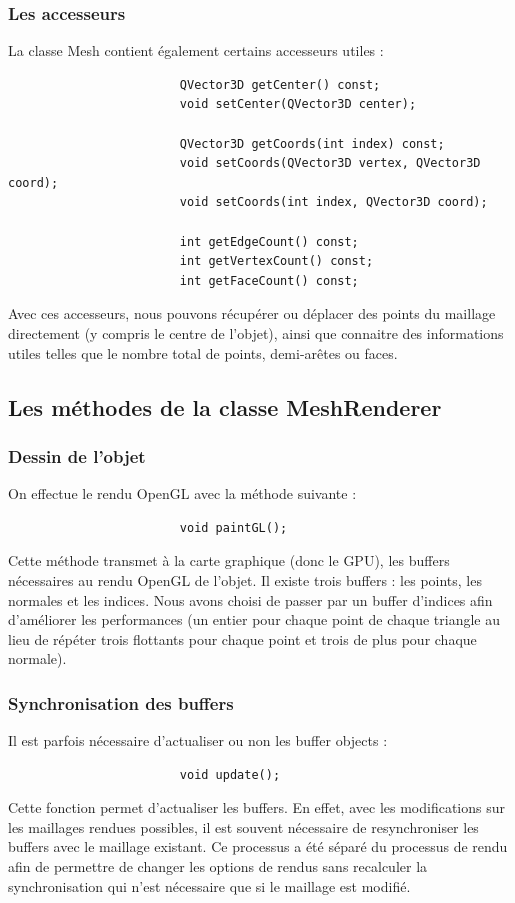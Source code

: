 \documentclass[a4paper]{memoir}
\begin{document}
				\subsubsection{Les accesseurs}
					La classe Mesh contient également certains accesseurs utiles :
					\begin{verbatim}
						QVector3D getCenter() const;
						void setCenter(QVector3D center);

						QVector3D getCoords(int index) const;
						void setCoords(QVector3D vertex, QVector3D coord);
						void setCoords(int index, QVector3D coord);

						int getEdgeCount() const;
						int getVertexCount() const;
						int getFaceCount() const;
					\end{verbatim}
					Avec ces accesseurs, nous pouvons récupérer ou déplacer des points du maillage directement (y compris le centre de l'objet), ainsi que 
					connaitre des informations utiles telles que le nombre total de points, demi-arêtes ou faces.
				
			\subsection{Les méthodes de la classe MeshRenderer}
				\label{renderer-dev}
				\subsubsection{Dessin de l'objet}
					On effectue le rendu OpenGL avec la méthode suivante :
					\begin{verbatim}
						void paintGL();
					\end{verbatim}
					Cette méthode transmet à la carte graphique (donc le GPU), les buffers nécessaires au rendu OpenGL de l'objet. Il existe trois buffers : 
					les points, les normales et les indices. Nous avons choisi de passer par un buffer d'indices afin d'améliorer les performances (un 
					entier pour chaque point de chaque triangle au lieu de répéter trois flottants pour chaque point et trois de plus pour chaque normale).
					
				\subsubsection{Synchronisation des buffers}
					Il est parfois nécessaire d'actualiser ou non les buffer objects :
					\begin{verbatim}
						void update();
					\end{verbatim}
					Cette fonction permet d'actualiser les buffers. En effet, avec les modifications sur les maillages rendues possibles, il est souvent 
					nécessaire de resynchroniser les buffers avec le maillage existant. Ce processus a été séparé du processus de rendu afin de permettre de 
					changer les options de rendus sans recalculer la synchronisation qui n'est nécessaire que si le maillage est modifié.
				
\end{document}
